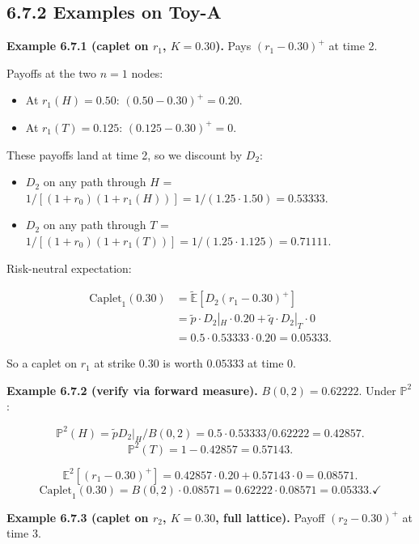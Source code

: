 \documentclass[
  10pt,
  twoside]{book}
\providecommand{\tightlist}{%
  \setlength{\itemsep}{0pt}\setlength{\parskip}{0pt}}
\begin{document}
\subsection{6.7.2 Examples on Toy-A}\label{examples-on-toy-a-3}

\textbf{Example 6.7.1 (caplet on \(r_1\), \(K = 0.30\)).} Pays
\((r_1 - 0.30)^+\) at time 2.

Payoffs at the two \(n=1\) nodes:

\begin{itemize}
\tightlist
\item
  At \(r_1(H) = 0.50\): \((0.50 - 0.30)^+ = 0.20\).
\item
  At \(r_1(T) = 0.125\): \((0.125 - 0.30)^+ = 0\).
\end{itemize}

These payoffs land at time 2, so we discount by \(D_2\):

\begin{itemize}
\tightlist
\item
  \(D_2\) on any path through \(H\) =
  \(1/[(1+r_0)(1+r_1(H))] = 1/(1.25 \cdot 1.50) = 0.53333\).
\item
  \(D_2\) on any path through \(T\) =
  \(1/[(1+r_0)(1+r_1(T))] = 1/(1.25 \cdot 1.125) = 0.71111\).
\end{itemize}

Risk-neutral expectation:

\[\begin{aligned}
\text{Caplet}_1(0.30) &= \tilde{\mathbb E}[D_2 (r_1 - 0.30)^+] \\
&= \tilde p \cdot D_2|_H \cdot 0.20 + \tilde q \cdot D_2|_T \cdot 0 \\
&= 0.5 \cdot 0.53333 \cdot 0.20 = 0.05333.
\end{aligned}\]

So a caplet on \(r_1\) at strike \(0.30\) is worth \(0.05333\) at time
0.

\textbf{Example 6.7.2 (verify via forward measure).}
\(B(0, 2) = 0.62222\). Under \(\mathbb P^2\):

\[\mathbb P^2(H) = \tilde p D_2|_H / B(0, 2) = 0.5 \cdot 0.53333 / 0.62222 = 0.42857.\]
\[\mathbb P^2(T) = 1 - 0.42857 = 0.57143.\]

\[\mathbb E^2[(r_1 - 0.30)^+] = 0.42857 \cdot 0.20 + 0.57143 \cdot 0 = 0.08571.\]
\[\text{Caplet}_1(0.30) = B(0, 2) \cdot 0.08571 = 0.62222 \cdot 0.08571 = 0.05333. ✓\]

\textbf{Example 6.7.3 (caplet on \(r_2\), \(K = 0.30\), full lattice).}
Payoff \((r_2 - 0.30)^+\) at time 3.
\end{document}
